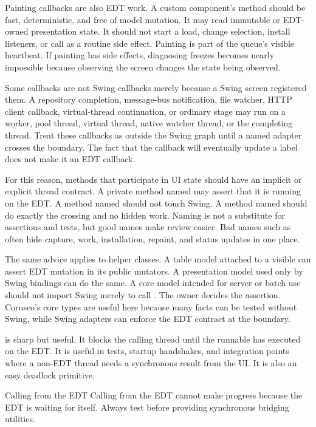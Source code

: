 Painting callbacks are also EDT work. A custom component's  method should be fast, deterministic, and free of model mutation. It may read immutable or EDT-owned presentation state. It should not start a load, change selection, install listeners, or call  as a routine side effect. Painting is part of the queue's visible heartbeat. If painting has side effects, diagnosing freezes becomes nearly impossible because observing the screen changes the state being observed.

Some callbacks are not Swing callbacks merely because a Swing screen registered them. A repository completion, message-bus notification, file watcher, HTTP client callback, virtual-thread continuation, or ordinary  stage may run on a worker, pool thread, virtual thread, native watcher thread, or the completing thread. Treat these callbacks as outside the Swing graph until a named adapter crosses the boundary. The fact that the callback will eventually update a label does not make it an EDT callback.

For this reason, methods that participate in UI state should have an implicit or explicit thread contract. A private method named  may assert that it is running on the EDT. A method named  should not touch Swing. A method named  should do exactly the crossing and no hidden work. Naming is not a substitute for assertions and tests, but good names make review easier. Bad names such as  often hide capture, work, installation, repaint, and status updates in one place.

The same advice applies to helper classes. A table model attached to a visible  can assert EDT mutation in its public mutators. A presentation model used only by Swing bindings can do the same. A core model intended for server or batch use should not import Swing merely to call . The owner decides the assertion. Corusco's core types are useful here because many facts can be tested without Swing, while Swing adapters can enforce the EDT contract at the boundary.

 is sharp but useful. It blocks the calling thread until the runnable has executed on the EDT. It is useful in tests, startup handshakes, and integration points where a non-EDT thread needs a synchronous result from the UI. It is also an easy deadlock primitive.

\begin{pitfallbox}{Calling  from the EDT}
Calling  from the EDT cannot make progress because the EDT is waiting for itself. Always test  before providing synchronous bridging utilities.
\end{pitfallbox}

